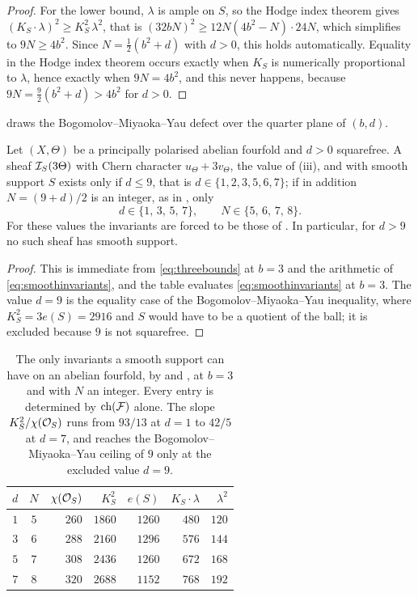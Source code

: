\begin{proof}
For the lower bound, $\lambda$ is ample on $S$, so the Hodge index theorem
gives $(K_{S}\cdot\lambda)^{2}\ge K_{S}^{2}\,\lambda^{2}$, that is
$(32bN)^{2}\ge12N(4b^{2}-N)\cdot24N$, which simplifies to $9N\ge4b^{2}$. Since
$N=\tfrac12(b^{2}+d)$ with $d>0$, this holds automatically. Equality in the
Hodge index theorem occurs exactly when $K_{S}$ is numerically proportional to
$\lambda$, hence exactly when $9N=4b^{2}$, and this never happens, because
$9N=\tfrac92(b^{2}+d)>4b^{2}$ for $d>0$.
\end{proof}

 draws the Bogomolov--Miyaoka--Yau defect over the
quarter plane of $(b,d)$.

\begin{corollary}\label{cor:fourdiscriminants}
Let $(X,\Theta)$ be a principally polarised abelian fourfold and $d>0$
squarefree. A sheaf $\mathcal{I}_{S}(3\Theta)$ with Chern character
$u_{\Theta}+3v_{\Theta}$, the value of (iii), and with
smooth support $S$ exists only if $d\le9$, that is
$d\in\{1,2,3,5,6,7\}$; if in addition $N=(9+d)/2$ is an integer, as in
, only
\[
  d\in\{1,\,3,\,5,\,7\},\qquad N\in\{5,\,6,\,7,\,8\}.
\]
For these values the invariants are forced to be those of
. In particular, for $d>9$ no such sheaf has smooth
support.
\end{corollary}

\begin{proof}
This is immediate from \eqref{eq:threebounds} at $b=3$ and the arithmetic of
\eqref{eq:smoothinvariants}, and the table evaluates
\eqref{eq:smoothinvariants} at $b=3$. The value $d=9$ is the equality case of the
Bogomolov--Miyaoka--Yau inequality, where $K_{S}^{2}=3e(S)=2916$ and $S$ would
have to be a quotient of the ball; it is excluded because $9$ is not
squarefree.
\end{proof}

\begin{table}[htbp]
\centering
\small
\renewcommand{\arraystretch}{1.12}
\begin{tabular}{@{}ccrrrrr@{}}
\toprule
$d$ & $N$ & $\chi(\mathcal{O}_{S})$ & $K_{S}^{2}$ & $e(S)$ &
$K_{S}\cdot\lambda$ & $\lambda^{2}$ \\
\midrule
$1$ & $5$ & $260$ & $1860$ & $1260$ & $480$ & $120$ \\
$3$ & $6$ & $288$ & $2160$ & $1296$ & $576$ & $144$ \\
$5$ & $7$ & $308$ & $2436$ & $1260$ & $672$ & $168$ \\
$7$ & $8$ & $320$ & $2688$ & $1152$ & $768$ & $192$ \\
\bottomrule
\end{tabular}
\caption{The only invariants a smooth support can have on an abelian
fourfold, by  and
, at $b=3$ and with $N$ an integer. Every entry is
determined by $\operatorname{ch}(\mathcal{F})$ alone. The slope
$K_{S}^{2}/\chi(\mathcal{O}_{S})$ runs from $93/13$ at $d=1$ to $42/5$ at $d=7$, and
reaches the Bogomolov--Miyaoka--Yau ceiling of $9$ only at the excluded value
$d=9$.}
\label{tab:smoothsupport}
\end{table}

